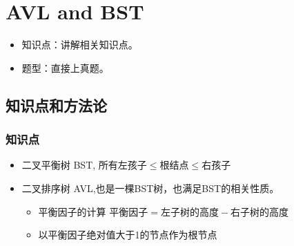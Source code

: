 
\chapter{AVL and BST}
\label{chap7}

\begin{itemize}[noitemsep,topsep=0pt,parsep=0pt,partopsep=0pt]
	\item 知识点：讲解相关知识点。
	\item 题型：直接上真题。
\end{itemize}

\section{知识点和方法论}

\subsection{知识点}
\begin{itemize}[noitemsep,topsep=0pt,parsep=0pt,partopsep=0pt]
	\item 二叉平衡树 BST, 所有$\mbox{左孩子} \le \mbox{根结点} \le \mbox{右孩子}$
	\item 二叉排序树 AVL,也是一棵BST树，也满足BST的相关性质。
	\begin{itemize}[noitemsep,topsep=0pt,parsep=0pt,partopsep=0pt]
		\item 平衡因子的计算 $ \mbox{平衡因子} = \mbox{左子树的高度} - \mbox{右子树的高度} $
		\item 以平衡因子绝对值大于1的节点作为根节点
	\end{itemize}
\end{itemize}


